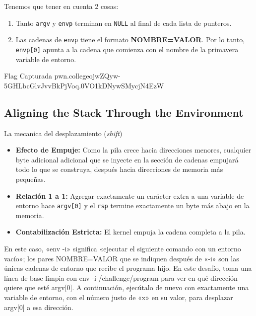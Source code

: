 Tenemos que tener en cuenta 2 cosas:

\begin{enumerate}
	\item Tanto \texttt{argv} y \texttt{envp} terminan en \texttt{NULL} al final de cada lista de punteros.
	\item Las cadenas de \texttt{envp} tiene el formato \textbf{NOMBRE=VALOR}. Por lo tanto, \texttt{envp[0]}
	      apunta a la cadena que comienza con el nombre de la primavera variable de entorno.
\end{enumerate}

\begin{flagbox}{Flag Capturada}
	pwn.college{ojwZQyw-5GHLbcGlvJvvBkPjVoq.0VO1kDNywSMycjN4EzW}
\end{flagbox}

\subsection{Aligning the Stack Through the Environment}\label{subsec:10-07aligning_the_stack_through_the_environment}

La mecanica del desplazamiento (\textit{shift})

\begin{itemize}
	\item \textbf{Efecto de Empuje: } Como la pila crece hacia direcciones menores, cualquier byte adicional adicional que se
	      inyecte en la sección de cadenas empujará todo lo que se construya, después hacia direcciones de memoria más pequeñas.
	\item \textbf{Relación 1 a 1:} Agregar exactamente un carácter extra a una variable de entorno hace \texttt{argv[0]} y el
	      \texttt{rsp} termine exactamente un byte más abajo en la memoria.
	\item \textbf{Contabilización Estricta: } El kernel empuja la cadena completa a la pila.
\end{itemize}

En este caso, «env -i» significa «ejecutar el siguiente comando con un entorno vacío»;
los pares NOMBRE=VALOR que se indiquen después de «-i» son las únicas cadenas de entorno que recibe el programa hijo.
En este desafío, toma una línea de base limpia con env -i /challenge/program para
ver en qué dirección quiere que esté argv[0]. A continuación, ejecútalo de nuevo
con exactamente una variable de entorno, con el número justo de «x» en su valor,
para desplazar argv[0] a esa dirección.

